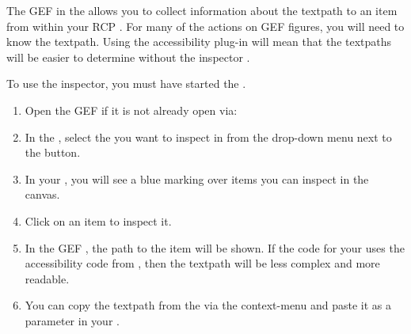 
The GEF \gdinspector in  the \ite{} allows you to collect information about the textpath to an item from within your RCP \gdaut{}. For many of the actions on GEF figures, you will need to know the textpath. Using the \app{} accessibility plug-in will mean that the textpaths will be easier to determine without the inspector . 

To use the inspector, you must have started the \gdaut{} . 
\begin{enumerate}
\item Open the GEF \gdinspector{} if it is not already open via:\\
\item In the \gdinspector{}, select the \gdaut{} you want to inspect in from the drop-down menu next to the  button.
\item In your \gdaut{}, you will see a blue marking over items you can inspect in the canvas. 
\item Click on an item to inspect it.
\item In the GEF \gdinspector{}, the path to the item will be shown. If the code for your \gdaut{} uses the accessibility code from \app{}, then the textpath will be less complex and more readable. 
\item You can copy the textpath from the \gdinspector{} via the context-menu and paste it as a parameter in your \gdcases{}. 
\end{enumerate}
